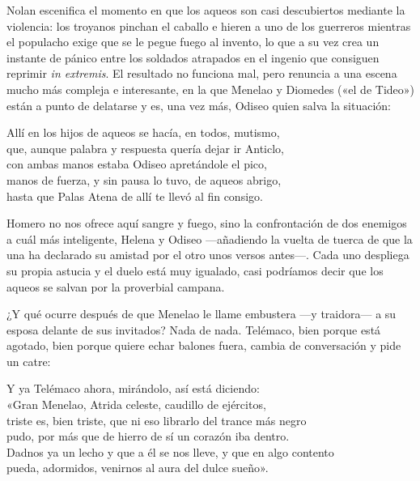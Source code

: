 Nolan escenifica el momento en que los aqueos son casi descubiertos mediante la violencia: los troyanos pinchan el caballo e hieren a uno de los guerreros mientras el populacho exige que se le pegue fuego al invento, lo que a su vez crea un instante de pánico entre los soldados atrapados en el ingenio que consiguen reprimir \emph{in extremis}. El resultado no funciona mal, pero renuncia a una escena mucho más compleja e interesante, en la que Menelao y Diomedes («el de Tideo») están a punto de delatarse y es, una vez más, Odiseo quien salva la situación:

\begin{versocita}
Allí en los hijos de aqueos se hacía, en todos, mutismo,\\
que, aunque palabra y respuesta quería dejar ir Anticlo,\\
con ambas manos estaba Odiseo apretándole el pico,\\
manos de fuerza, y sin pausa lo tuvo, de aqueos abrigo,\\
hasta que Palas Atena de allí te llevó al fin consigo.
\end{versocita}

Homero no nos ofrece aquí sangre y fuego, sino la confrontación de dos enemigos a cuál más inteligente, Helena y Odiseo ---añadiendo la vuelta de tuerca de que la una ha declarado su amistad por el otro unos versos antes---. Cada uno despliega su propia astucia y el duelo está muy igualado, casi podríamos decir que los aqueos se salvan por la proverbial campana.

¿Y qué ocurre después de que Menelao le llame embustera ---y traidora--- a su esposa delante de sus invitados? Nada de nada. Telémaco, bien porque está agotado, bien porque quiere echar balones fuera, cambia de conversación y pide un catre:

\begin{versocita}
Y ya Telémaco ahora, mirándolo, así está diciendo:\\
«Gran Menelao, Atrida celeste, caudillo de ejércitos,\\
triste es, bien triste, que ni eso librarlo del trance más negro\\
pudo, por más que de hierro de sí un corazón iba dentro.\\
Dadnos ya un lecho y que a él se nos lleve, y que en algo contento\\
pueda, adormidos, venirnos al aura del dulce sueño».
\end{versocita}

